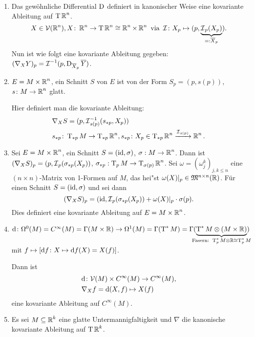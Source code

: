 \begin{bsp}\begin{enumerate}[label=\arabic*),leftmargin=*]
\item
	Das gewöhnliche Differential $\operatorname{D}$ definiert in kanonischer Weise eine kovariante Ableitung auf $\operatorname{T}\operatorname{\mathbb{R}}^n$.
	\begin{align*}
		X \in \mathcal V(\operatorname{\mathbb{R}}^n), X \colon \operatorname{\mathbb{R}}^n \to \operatorname{T}\operatorname{\mathbb{R}}^n \cong \operatorname{\mathbb{R}}^n \times \operatorname{\mathbb{R}}^n \text{ via } \operatorname{\mathcal{I}}\colon X_p \mapsto (p,\underbrace{\operatorname{\mathcal{I}}_p(X_p)}_{=:\overline X_p}).
	\end{align*}
	Nun ist wie folgt eine kovariante Ableitung gegeben: $(\nabla_XY)_p = \operatorname{\mathcal{I}}^{-1}(p,\operatorname{D}_{\overline X_p}\overline Y)$.
\item
	$E = M \times \operatorname{\mathbb{R}}^n$, ein Schnitt $S$ von $E$ ist von der Form $S_p = (p,s(p))$, $s \colon M \to \operatorname{\mathbb{R}}^n$ glatt.

	Hier definiert man die kovariante Ableitung:
	\begin{align*}
		& \nabla_XS = (p,\operatorname{\mathcal{I}}_{s(p)}^{-1}(s_{*p},X_p))\\
		&  s_{*p}\colon \operatorname{T}_{*p}M \to \operatorname{T}_{*p}\operatorname{\mathbb{R}}^n, s_{*p}\colon X_p \in \operatorname{T}_{*p}\operatorname{\mathbb{R}}^n \xrightarrow{\operatorname{\mathcal{I}}_{s(p)}} \operatorname{\mathbb{R}}^n.
	\end{align*}
\item
	Sei $E = M \times \operatorname{\mathbb{R}}^n$, ein Schnitt $S = (\operatorname{id}, \sigma)$, $\sigma: M \to \operatorname{\mathbb{R}}^n$. Dann ist $(\nabla_X S)_p = (p, \operatorname{\mathcal{I}}_p(\sigma_{*p}(X_p))$, $\sigma_{*p}: \operatorname{T}_pM \to \operatorname{T}_{\sigma(p)}\operatorname{\mathbb{R}}^n$. Sei $ \omega = (\omega_j^k)_{j,k \le n}$ eine $(n\times n)$-Matrix von 1-Formen auf $M$, das hei"st $\omega(X)|_p \in \mathfrak M^{n\times n}(\operatorname{\mathbb{R}})$.
	Für einen Schnitt $S = (\operatorname{id}, \sigma)$ und sei dann
		\[ (\nabla_XS)_p = (\operatorname{id}, \operatorname{\mathcal{I}}_p(\sigma_{*p}(X_p)) + \omega(X)|_p \cdot \sigma(p). \]
	Dies definiert eine kovariante Ableitung auf $E = M \times \operatorname{\mathbb{R}}^n$.
\item
	$\dop \colon \Omega^0(M) = C^{\infty}(M) = \Gamma(M\times \R) \to \Omega^1(M) = \Gamma(\T^{*}M) = \Gamma(\underbrace{\T^{*}M \otimes (M \times \R)}_{\mathclap{\text{Fasern: } \T_p^{*}M\otimes\R \cong \T_p^{*}M}})$ mit $f \mapsto [\mathrm{d} f \colon X \mapsto \mathrm{d} f(X) = X(f)]$.

	Dann ist
	\begin{align*}
		& \mathrm{d} \colon \mathcal V(M) \times C^{\infty}(M) \to C^{\infty}(M),\\
		& \nabla_Xf = \mathrm{d} (X,f) \mapsto X(f)
	\end{align*}
	eine kovariante Ableitung auf $C^{\infty}(M)$.
\item
	Es sei $M \subseteq \operatorname{\mathbb{R}}^k$ eine glatte Untermannigfaltigkeit und $\nabla$ die kanonische kovariante Ableitung auf $\operatorname{T} \operatorname{\mathbb{R}}^k$.


\end{enumerate}
\end{bsp}
